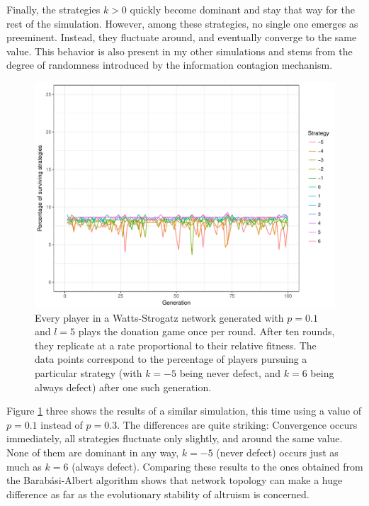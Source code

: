 \documentclass[12pt]{article}
\begin{document}
Finally, the strategies $k>0$ quickly become dominant and stay that way for the rest of the simulation. However, among these strategies, no single one emerges as preeminent. Instead, they fluctuate around, and eventually converge to the same value. This behavior is also present in my other simulations and stems from the degree of randomness introduced by the information contagion mechanism.

\begin{figure}
    \centering
    \includegraphics[width=\linewidth]{../figures/results_WS_300_default.pdf}
    \caption{Every player in a Watts-Strogatz network generated with $p=0.1$ and $l=5$ plays the donation game once per round. After ten rounds, they replicate at a rate proportional to their relative fitness. The data points correspond to the percentage of players pursuing a particular strategy (with $k=-5$ being never defect, and $k=6$ being always defect) after one such generation.}
    \label{WS_300_default}
\end{figure}

Figure \ref{WS_300_default} three shows the results of a similar simulation, this time using a value of $p=0.1$ instead of $p=0.3$. The differences are quite striking: Convergence occurs immediately, all strategies fluctuate only slightly, and around the same value. None of them are dominant in any way, $k=-5$ (never defect) occurs just as much as $k=6$ (always defect). Comparing these results to the ones obtained from the Barab\'{a}si-Albert algorithm shows that network topology can make a huge difference as far as the evolutionary stability of altruism is concerned.
\end{document}
